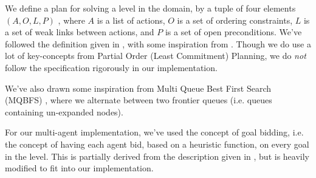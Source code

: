 \documentclass[Main]{subfiles}
\begin{document}
We define a plan for solving a level in the domain, by a tuple of four elements $(A,O,L,P)$ \citep{Weld1994}\citep{Russell2003}, where $A$ is a list of actions, $O$ is a set of ordering constraints, $L$ is a set of weak links between actions, and $P$ is a set of open preconditions. 
We've followed the definition given in \cite{Russell2003}, with some inspiration from \cite{Weld1994}.
Though we do use a lot of key-concepts from Partial Order (Least Commitment) Planning, we do \textit{not} follow the specification rigorously in our implementation.

We've also drawn some inspiration from Multi Queue Best First Search (MQBFS) \citep[p.~38]{hector2013a}, where we alternate between two frontier queues (i.e. queues containing un-expanded nodes).

For our multi-agent implementation, we've used the concept of goal bidding, i.e. the concept of having each agent bid, based on a heuristic function, on every goal in the level.
This is partially derived from the description given in \cite{VanderKrogt2005}, but is heavily modified to fit into our implementation.
\end{document}
